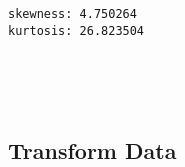 \documentclass[11pt]{article}
\begin{document}
    \begin{Verbatim}[commandchars=\\\{\}]
skewness: 4.750264
kurtosis: 26.823504

    \end{Verbatim}

    \begin{center}
    \end{center}
    { \hspace*{\fill} \\}
    
    \begin{center}
    \end{center}
    { \hspace*{\fill} \\}
    
    \hypertarget{transform-data}{%
\subsection{Transform Data}\label{transform-data}}
\end{document}
